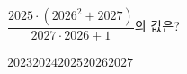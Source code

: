 $\dfrac{2025\cdot(2026^2+2027)}{2027\cdot 2026+1}$의 값은?
\begin{choices32}{$2023$}{$2024$}{$2025$}{$2026$}{$2027$}\end{choices32}

